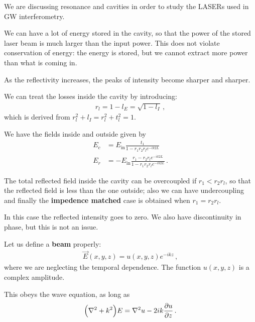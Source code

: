 \documentclass[main.tex]{subfiles}
\begin{document}

We are discussing resonance and cavities in order to study the LASERs used in GW interferometry. 

We can have a lot of energy stored in the cavity, so that the power of the stored laser beam is much larger than the input power.
This does not violate conservation of energy: the energy is stored, but we cannot extract more power than what is coming in. 

As the reflectivity increases, the peaks of intensity become sharper and sharper. 

We can treat the losses inside the cavity by introducing: 
%
\begin{align}
r_{l} = 1 - l_{E} = \sqrt{1 - l_{I}}
\,,
\end{align}
%
which is derived from \(r_l^2 + l_I = r_l^2 + t_l^2 = 1\). 

We have the fields inside and outside given by 
%
\begin{subequations}
\begin{align}
E_{c} &= E _{\text{in}} \frac{t_1 }{1 - r_1 r_2 r_{l} e^{-ik2L}}  \\
E_{r} &= - E _{\text{in}} \frac{r_1 - r_2 r_{l} e^{-ik2L}}{1 - r_1 r_2 r_{l} e^{-ik 2L}}
\,.
\end{align}
\end{subequations}

The total reflected field inside the cavity can be overcoupled if \(r_1 < r_2 r_{l}\), so that the reflected field is less than the one outside; also we can have undercoupling and finally the \textbf{impedence matched} case is obtained when \(r_1 = r_2 r_{l}\). 

In this case the reflected intensity goes to zero. We also have discontinuity in phase, but this is not an issue. 

Let us define a \textbf{beam} properly: 
%
\begin{align}
\vec{E}(x, y, z) = u (x, y, z) e^{-ikz}
\,,
\end{align}
%
where we are neglecting the temporal dependence. 
The function \(u(x, y, z)\) is a complex amplitude. 

This obeys the wave equation, as long as 
%
\begin{align}
\qty(\nabla^2 + k^2) E = \nabla^2 u  - 2ik \pdv{u}{z}
\,.
\end{align}
\end{document}
